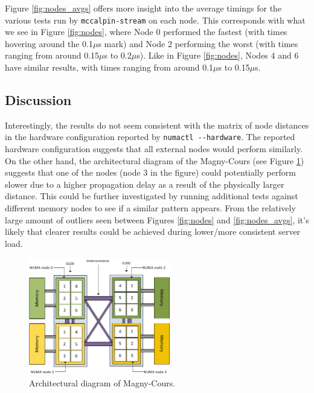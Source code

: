 \documentclass[11pt,twoside]{article}
\newcommand{\inlinecode}{\texttt}
\begin{document}
Figure \ref{fig:nodes_avgs} offers more insight into the average timings for the various tests run by \inlinecode{mccalpin-stream} on each node. This corresponds with what we see in Figure \ref{fig:nodes}, where Node 0 performed the fastest (with times hovering around the 0.1$\mu$s mark) and Node 2 performing the worst (with times ranging from around 0.15$\mu$s to 0.2$\mu$s). Like in Figure \ref{fig:nodes}, Nodes 4 and 6 have similar results, with times ranging from around 0.1$\mu$s to 0.15$\mu$s.


\subsection{Discussion}
Interestingly, the results do not seem consistent with the matrix of node distances in the hardware configuration reported by \inlinecode{numactl -{}-hardware}. The reported hardware configuration suggests that all external nodes would perform similarly. On the other hand, the architectural diagram of the Magny-Cours (see Figure \ref{fig:magny}) suggests that one of the nodes (node 3 in the figure) could potentially perform slower due to a higher propagation delay as a result of the physically larger distance. This could be further investigated by running additional tests against different memory nodes to see if a similar pattern appears. From the relatively large amount of outliers seen between Figures \ref{fig:nodes} and \ref{fig:nodes_avgs}, it's likely that clearer results could be achieved during lower/more consistent server load.

\begin{figure}[!htbp]
    \centering
    \includegraphics[width=0.55\textwidth]{Magny-cours-21.png}
    \caption{Architectural diagram of Magny-Cours.}
    \label{fig:magny}
\end{figure}
\end{document}
